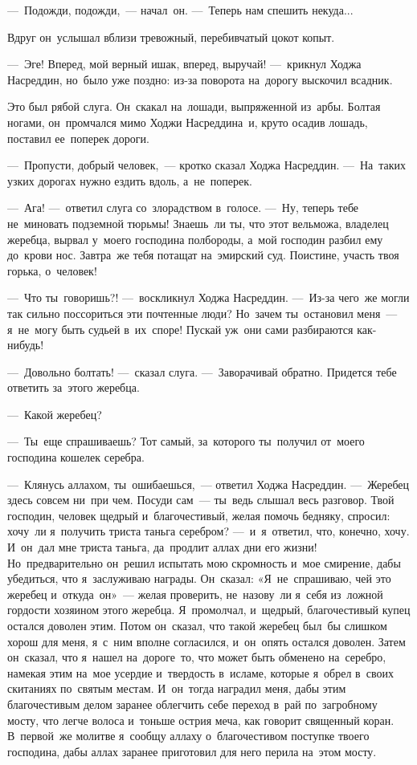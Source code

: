 \documentclass[12pt,a4paper]{book}
\begin{document}
—~Подожди, подожди,~— начал~он. —~Теперь нам спешить некуда...

Вдруг он~услышал вблизи тревожный, перебивчатый цокот копыт.

—~Эге! Вперед, мой верный ишак, вперед, выручай! —~крикнул Ходжа Насреддин, но~было уже поздно: из-за поворота на~дорогу выскочил всадник.

Это был рябой слуга. Он~скакал на~лошади, выпряженной из~арбы. Болтая ногами, он~промчался мимо Ходжи Насреддина~и, круто осадив лошадь, поставил ее~поперек дороги.

—~Пропусти, добрый человек,~— кротко сказал Ходжа Насреддин. —~На~таких узких дорогах нужно ездить вдоль, а~не~поперек.

—~Ага! —~ответил слуга со~злорадством в~голосе. —~Ну, теперь тебе не~миновать подземной тюрьмы! Знаешь~ли ты, что этот вельможа, владелец жеребца, вырвал у~моего господина полбороды, а~мой господин разбил ему до~крови нос. Завтра~же тебя потащат на~эмирский суд. Поистине, участь твоя горька, о~человек!

—~Что ты~говоришь?! —~воскликнул Ходжа Насреддин. —~Из-за чего~же могли так сильно поссориться эти почтенные люди? Но~зачем ты~остановил меня~— я~не~могу быть судьей в~их~споре! Пускай уж~они сами разбираются как-нибудь!

—~Довольно болтать! —~сказал слуга. —~Заворачивай обратно. Придется тебе ответить за~этого жеребца.

—~Какой жеребец?

—~Ты~еще спрашиваешь? Тот самый, за~которого ты~получил от~моего господина кошелек серебра.

—~Клянусь аллахом, ты~ошибаешься,~— ответил Ходжа Насреддин. —~Жеребец здесь совсем ни~при чем. Посуди сам~— ты~ведь слышал весь разговор. Твой господин, человек щедрый и~благочестивый, желая помочь бедняку, спросил: хочу~ли я~получить триста таньга серебром? —~и~я~ответил, что, конечно, хочу. И~он~дал мне триста таньга, да~продлит аллах дни его жизни! Но~предварительно он~решил испытать мою скромность и~мое смирение, дабы убедиться, что я~заслуживаю награды. Он~сказал: «Я~не~спрашиваю, чей это жеребец и~откуда~он»~— желая проверить, не~назову~ли я~себя из~ложной гордости хозяином этого жеребца. Я~промолчал, и~щедрый, благочестивый купец остался доволен этим. Потом он~сказал, что такой жеребец был~бы слишком хорош для меня, я~с~ним вполне согласился, и~он~опять остался доволен. Затем он~сказал, что я~нашел на~дороге~то, что может быть обменено на~серебро, намекая этим на~мое усердие и~твердость в~исламе, которые я~обрел в~своих скитаниях по~святым местам. И~он~тогда наградил меня, дабы этим благочестивым делом заранее облегчить себе переход в~рай по~загробному мосту, что легче волоса и~тоньше острия меча, как говорит священный коран. В~первой~же молитве я~сообщу аллаху о~благочестивом поступке твоего господина, дабы аллах заранее приготовил для него перила на~этом мосту.
\end{document}
